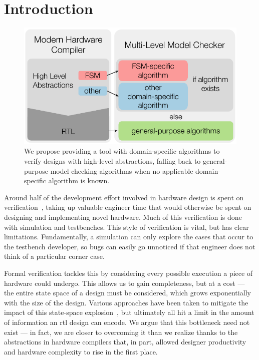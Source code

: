 \documentclass[acmsmall,screen,review]{acmart}
\begin{document}
\section{Introduction}
\begin{figure}
  \includegraphics[width=0.8\columnwidth]{core-idea.pdf}
  \caption{We propose providing a tool with domain-specific algorithms to verify designs with high-level abstractions, falling back to general-purpose model checking algorithms when no applicable domain-specific algorithm is known.} \label{fig:intro-verif}
\end{figure}

Around half of the development effort involved in hardware design is spent on verification~\cite{wilson2018verifstudy, wilson2020verifstudy, wilson2022verifstudy}, taking up valuable engineer time that would otherwise be spent on designing and implementing novel hardware.
Much of this verification is done with simulation and testbenches.
This style of verification is vital, but has clear limitations.
Fundamentally, a simulation can only explore the cases that occur to the testbench developer, so bugs can easily go unnoticed if that engineer does not think of a particular corner case.

Formal verification tackles this by considering every possible execution a piece of hardware could undergo.
This allows us to gain completeness, but at a cost --- the entire state space of a design must be considered, which grows exponentially with the size of the design.
Various approaches have been taken to mitigate the impact of this state-space explosion~\cite{Clarke2001, clarke2012explosion, nejati2021explosion}, but ultimately all hit a limit in the amount of information an \ac{rtl} design can encode.
We argue that this bottleneck need not exist --- in fact, we are closer to overcoming it than we realize thanks to the abstractions in hardware compilers that, in part, allowed designer productivity and hardware complexity to rise in the first place.
\end{document}
